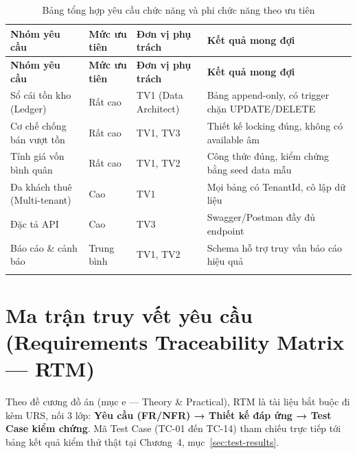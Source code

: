 \begin{longtable}{|p{2.6cm}|p{2.2cm}|p{3cm}|p{4.6cm}|}
\hline
\textbf{Nhóm yêu cầu} & \textbf{Mức ưu tiên} & \textbf{Đơn vị phụ trách} & \textbf{Kết quả mong đợi} \\
\hline
\endfirsthead
\hline
\textbf{Nhóm yêu cầu} & \textbf{Mức ưu tiên} & \textbf{Đơn vị phụ trách} & \textbf{Kết quả mong đợi} \\
\hline
\endhead
Sổ cái tồn kho (Ledger) & Rất cao & TV1 (Data Architect) & Bảng append-only, có trigger chặn UPDATE/DELETE \\
\hline
Cơ chế chống bán vượt tồn & Rất cao & TV1, TV3 & Thiết kế locking đúng, không có available âm \\
\hline
Tính giá vốn bình quân & Rất cao & TV1, TV2 & Công thức đúng, kiểm chứng bằng seed data mẫu \\
\hline
Đa khách thuê (Multi-tenant) & Cao & TV1 & Mọi bảng có TenantId, cô lập dữ liệu \\
\hline
Đặc tả API & Cao & TV3 & Swagger/Postman đầy đủ endpoint \\
\hline
Báo cáo \& cảnh báo & Trung bình & TV1, TV2 & Schema hỗ trợ truy vấn báo cáo hiệu quả \\
\hline
\caption{Bảng tổng hợp yêu cầu chức năng và phi chức năng theo ưu tiên}
\end{longtable}

\section{Ma trận truy vết yêu cầu (Requirements Traceability Matrix — RTM)}
\label{sec:rtm}

Theo đề cương đồ án (mục e — Theory \& Practical), RTM là tài liệu bắt buộc đi kèm URS, nối 3 lớp: \textbf{Yêu cầu (FR/NFR) → Thiết kế đáp ứng → Test Case kiểm chứng}. Mã Test Case (TC-01 đến TC-14) tham chiếu trực tiếp tới bảng kết quả kiểm thử thật tại Chương~4, mục~\ref{sec:test-results}.

